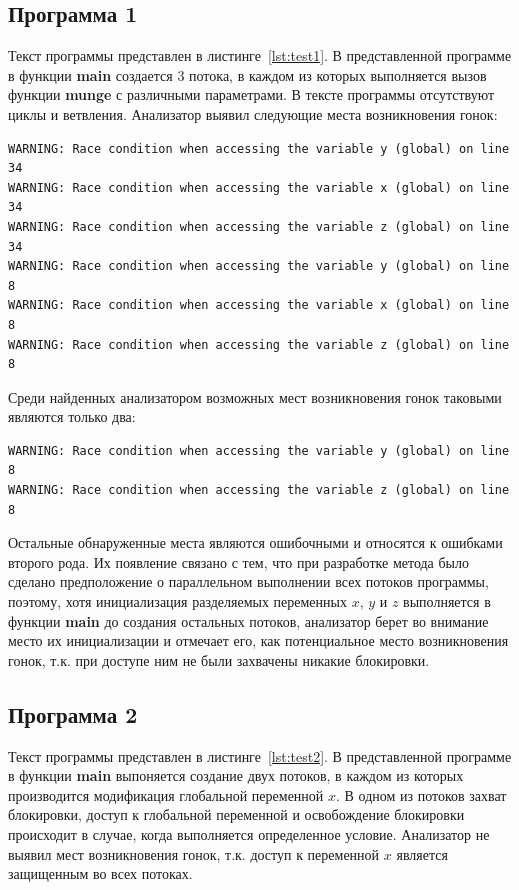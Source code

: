 \subsection{Программа 1}

Текст программы представлен в листинге~\ref{lst:test1}. В представленной программе в функции \textbf{main} создается 3 потока, в каждом из которых выполняется вызов функции \textbf{munge} с различными параметрами. В тексте программы отсутствуют циклы и ветвления. Анализатор выявил следующие места возникновения гонок:
\begin{verbatim}
WARNING: Race condition when accessing the variable y (global) on line 34
WARNING: Race condition when accessing the variable x (global) on line 34
WARNING: Race condition when accessing the variable z (global) on line 34
WARNING: Race condition when accessing the variable y (global) on line 8
WARNING: Race condition when accessing the variable x (global) on line 8
WARNING: Race condition when accessing the variable z (global) on line 8
\end{verbatim}
Среди найденных анализатором возможных мест возникновения гонок таковыми являются только два:
\begin{verbatim}
WARNING: Race condition when accessing the variable y (global) on line 8
WARNING: Race condition when accessing the variable z (global) on line 8
\end{verbatim}
Остальные обнаруженные места являются ошибочными и относятся к ошибками второго рода. Их появление связано с тем, что при разработке метода было сделано предположение о параллельном выполнении всех потоков программы, поэтому, хотя инициализация разделяемых переменных $x$, $y$ и $z$ выполняется в функции \textbf{main} до создания остальных потоков, анализатор берет во внимание место их инициализации и отмечает его, как потенциальное место возникновения гонок, т.к. при доступе ним не были захвачены никакие блокировки.



\subsection{Программа 2}

Текст программы представлен в листинге~\ref{lst:test2}. В представленной программе в функции \textbf{main} выпоняется создание двух потоков, в каждом из которых производится модификация глобальной переменной $x$. В одном из потоков захват блокировки, доступ к глобальной переменной и освобождение блокировки происходит в случае, когда выполняется определенное условие. Анализатор не выявил мест возникновения гонок, т.к. доступ к переменной $x$ является защищенным во всех потоках.

